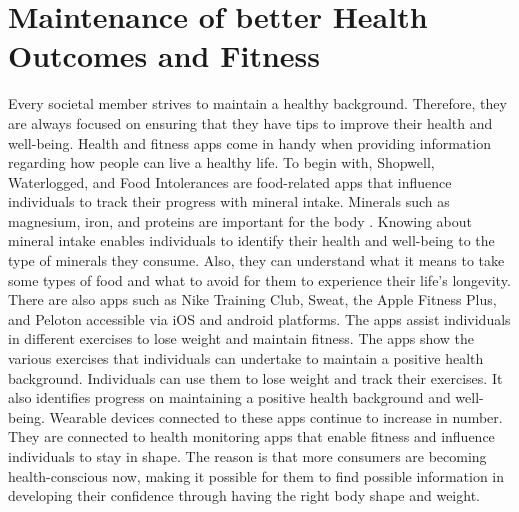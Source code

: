 \documentclass{article}
\begin{document}
\medskip

\section*{Maintenance of better Health Outcomes and Fitness}
Every societal member strives to maintain a healthy background. Therefore, they are always focused on ensuring that they have tips to improve their health and well-being. Health and fitness apps come in handy when providing information regarding how people can live a healthy life. To begin with, Shopwell, Waterlogged, and Food Intolerances are food-related apps that influence individuals to track their progress with mineral intake. Minerals such as magnesium, iron, and proteins are important for the body \cite{Milne20}. Knowing about mineral intake enables individuals to identify their health and well-being to the type of minerals they consume. Also, they can understand what it means to take some types of food and what to avoid for them to experience their life's longevity. 
There are also apps such as Nike Training Club, Sweat, the Apple Fitness Plus, and Peloton accessible via iOS and android platforms. The apps assist individuals in different exercises to lose weight and maintain fitness. The apps show the various exercises that individuals can undertake to maintain a positive health background. Individuals can use them to lose weight and track their exercises. It also identifies progress on maintaining a positive health background and well-being. Wearable devices connected to these apps continue to increase in number. They are connected to health monitoring apps that enable fitness and influence individuals to stay in shape. The reason is that more consumers are becoming health-conscious now, making it possible for them to find possible information in developing their confidence through having the right body shape and weight. 

\medskip
\end{document}
